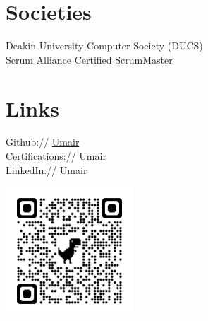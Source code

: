 \documentclass[a4paper,hidelinks]{deedy-resume} %
\begin{document}
\begin{minipage}[t]{0.33\textwidth}
\sectionspace %


\section{Societies}
Deakin University Computer Society (DUCS) \\
Scrum Alliance Certified ScrumMaster


\section{Links} 

Github:// \href{https://github.com/umairsaeed01}{Umair} \\
Certifications:// \href{https://skillsoft.digitalbadges.skillsoft.com/profile/umairsaeed185770/wallet}{Umair} \\
LinkedIn:// \href{https://www.linkedin.com/in/umirsaed/}{Umair} \\
\sectionspace %

\begin{flushleft}
    \includegraphics[width=0.36\textwidth]{qr_code.png}  %
\end{flushleft}


\end{minipage} 
\hfill
\end{document}
